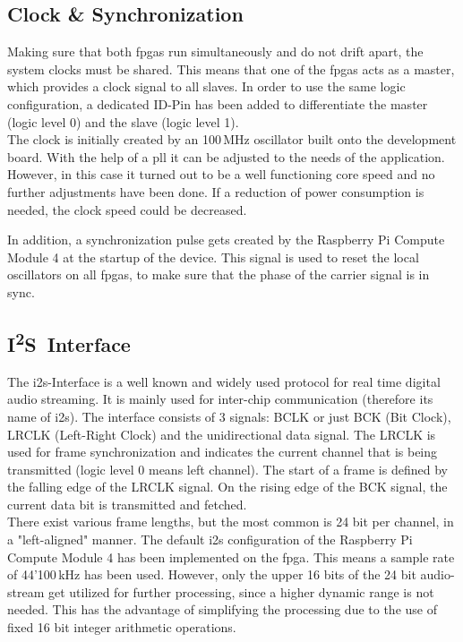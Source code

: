 \newpage
\subsection{Clock \& Synchronization}
Making sure that both \acrshort{fpga}s run simultaneously and do not drift apart, the system clocks must be shared. This means that one of the \acrshort{fpga}s acts as a master, which provides a clock signal to all slaves. In order to use the same logic configuration, a dedicated ID-Pin has been added to differentiate the master (logic level 0) and the slave (logic level 1).\\
The clock is initially created by an 100\,MHz oscillator built onto the development board. With the help of a \acrshort{pll} it can be adjusted to the needs of the application. However, in this case it turned out to be a well functioning core speed and no further adjustments have been done. If a reduction of power consumption is needed, the clock speed could be decreased.

In addition, a synchronization pulse gets created by the Raspberry Pi Compute Module 4 at the startup of the device. This signal is used to reset the local oscillators on all \acrshort{fpga}s, to make sure that the phase of the carrier signal is in sync.

\subsection{\texorpdfstring{I\textsuperscript{2}S}\ \ Interface} \label{fpga_i2s}
The \acrshort{i2s}-Interface is a well known and widely used protocol for real time digital audio streaming. It is mainly used for inter-chip communication (therefore its name of \acrlong{i2s}). The interface consists of 3 signals: BCLK or just BCK (Bit Clock), LRCLK (Left-Right Clock) and the unidirectional data signal. The LRCLK is used for frame synchronization and indicates the current channel that is being transmitted (logic level 0 means left channel). The start of a frame is defined by the falling edge of the LRCLK signal. On the rising edge of the BCK signal, the current data bit is transmitted and fetched.\\
There exist various frame lengths, but the most common is 24 bit per channel, in a "left-aligned" manner. The default \acrshort{i2s} configuration of the Raspberry Pi Compute Module 4 has been implemented on the \acrshort{fpga}. This means a sample rate of 44'100\,kHz has been used. However, only the upper 16 bits of the 24 bit audio-stream get utilized for further processing, since a higher dynamic range is not needed. This has the advantage of simplifying the processing due to the use of fixed 16 bit integer arithmetic operations.

